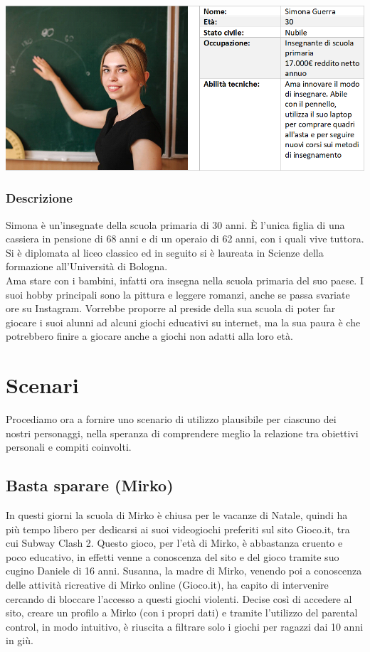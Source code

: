 \documentclass[../Report.tex]{subfiles}
\begin{document}
    \vspace{1.5cm}


    \begin{center}
        \includegraphics[width=0.9\linewidth]{Tab_Simona.png}
    \end{center}

    \subsubsection{Descrizione}
    Simona è un'insegnate della scuola primaria di 30 anni. È l'unica figlia di una cassiera in pensione di 68 anni e di un operaio di 62 anni, con i quali vive tuttora. Si è diplomata al liceo classico ed in seguito si è laureata in Scienze della formazione all'Università di Bologna.\\
    Ama stare con i bambini, infatti ora insegna nella scuola primaria del suo paese. I suoi hobby principali sono la pittura e leggere romanzi, anche se passa svariate ore su Instagram. Vorrebbe proporre al preside della sua scuola di poter far giocare i suoi alunni ad alcuni giochi educativi su internet, ma la sua paura è che potrebbero finire a giocare anche a giochi non adatti alla loro età.

    \section{Scenari}
    Procediamo ora a fornire uno scenario di utilizzo plausibile per ciascuno dei nostri personaggi, nella speranza di comprendere meglio la relazione tra obiettivi personali e compiti coinvolti.

    \subsection{Basta sparare (Mirko)}
    In questi giorni la scuola di Mirko è chiusa per le vacanze di Natale, quindi ha più tempo libero per dedicarsi ai suoi videogiochi preferiti sul sito Gioco.it, tra cui Subway Clash 2. Questo gioco, per l'età di Mirko, è abbastanza cruento e poco educativo, in effetti venne a conoscenza del sito e del gioco tramite suo cugino Daniele di 16 anni. Susanna, la madre di Mirko, venendo poi a conoscenza delle attività ricreative di Mirko online (Gioco.it), ha capito di intervenire cercando di bloccare l'accesso a questi giochi violenti. Decise così di accedere al sito, creare un profilo a Mirko (con i propri dati) e tramite l'utilizzo del parental control, in modo intuitivo, è riuscita a filtrare solo i giochi per ragazzi dai 10 anni in giù.
\end{document}
